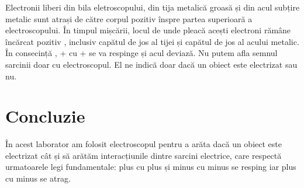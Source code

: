 \documentclass[12pt]{article}
\begin{document}
Electronii liberi din bila eletroscopului, din tija metalică groasă și din acul subțire metalic sunt atrași de către corpul pozitiv
înspre partea superioară a electroscopului. În timpul mișcării, locul de unde pleacă acești electroni rămâne încărcat pozitiv , inclusiv capătul
de jos al tijei și capătul de jos al acului metalic. În consecință , + cu  + se va respinge și acul deviază. Nu putem afla semnul sarcinii doar
cu electroscopul. El ne indică doar dacă un obiect este electrizat sau nu.

\section{Concluzie}

În acest laborator am folosit electroscopul pentru a arăta dacă un 
obiect este electrizat cât și să arătăm interacțiunile dintre sarcini 
electrice, care respectă urmatoarele legi fundamentale: plus cu plus și 
minus cu minus se resping iar plus cu minus se atrag.
\end{document}
